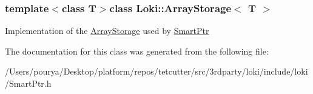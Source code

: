 \subsubsection*{template$<$class T$>$class Loki\+::\+Array\+Storage$<$ T $>$}

Implementation of the \hyperlink{classLoki_1_1ArrayStorage}{Array\+Storage} used by \hyperlink{classLoki_1_1SmartPtr}{Smart\+Ptr} 

The documentation for this class was generated from the following file\+:\begin{DoxyCompactItemize}
\item 
/\+Users/pourya/\+Desktop/platform/repos/tetcutter/src/3rdparty/loki/include/loki/Smart\+Ptr.\+h\end{DoxyCompactItemize}
